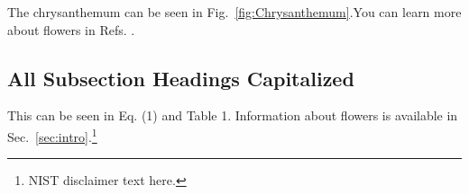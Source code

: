 \documentclass[12pt]{article}
\begin{document}
\normalsize The chrysanthemum can be seen in Fig.~\ref{fig:Chrysanthemum}.You can learn more about flowers in Refs. \cite{wilkinson_1990,Xiong2015,Prives2016,Roberts1982,Maloney2016,giancoli2008physics,Eston1993,MSU-CSE-06-2,Farindon,Marcheford,Joslin,Caxton,Isley,FIPS1402,SP80053r4}.
\subsection{All Subsection Headings Capitalized}
\label{ssec:headingscap}
This can be seen in Eq. (1) and Table 1. Information about flowers is available in Sec.~\ref{sec:intro}.\footnote{NIST disclaimer text here.}
\end{document}
